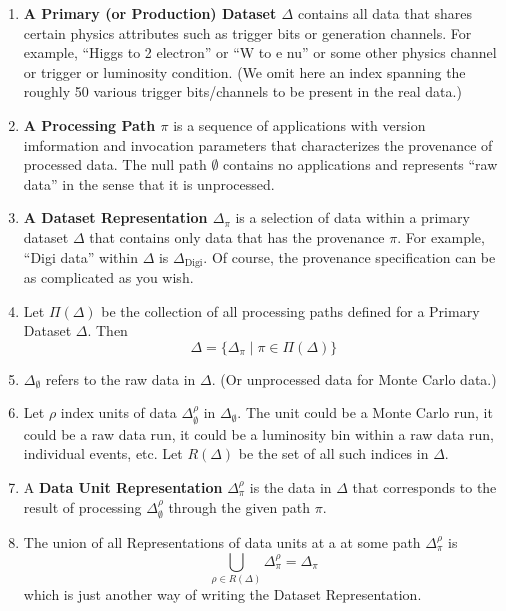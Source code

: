 \documentclass{cmspaper}
\begin{document}
\begin{enumerate}

\item {\bf A Primary (or Production) Dataset $\Delta$} 
contains all data that shares certain physics 
attributes such as trigger bits or generation channels.  For example, ``Higgs to 2 electron''
or ``W to e nu'' or some other physics channel or trigger or luminosity condition.  (We omit 
here an index spanning the roughly 50 various trigger bits/channels to be present in the 
real data.) 

\item {\bf A Processing Path $\pi$} is a sequence of applications with version imformation 
and invocation parameters that
characterizes the provenance of processed data.  The null path $\emptyset$ contains
no applications and represents ``raw data'' in the sense that it is unprocessed.  

\item {\bf A Dataset Representation $\Delta_{\pi}$} is a selection of data within a primary 
dataset $\Delta$ that contains only data that has the provenance $\pi$.  For example, 
``Digi data'' within $\Delta$ is $\Delta_{\mbox{Digi}}$.  Of course, the provenance specification 
can be as complicated as you wish.

\item Let $\Pi(\Delta)$ be the collection of all processing paths defined for a Primary 
Dataset $\Delta $.  Then 
\begin{equation}
    \Delta = \{ \Delta_{\pi} \mid \pi \in \Pi(\Delta) \}
\end{equation}

\item $\Delta_{\emptyset}$ refers to the raw data in $\Delta$. (Or unprocessed data for 
Monte Carlo data.) 

\item Let $\rho$ index units of data $\Delta_{\emptyset}^{\rho}$ 
in $\Delta_{\emptyset}$.  The unit 
could be a Monte Carlo run, it could be a raw data run, 
it could be a luminosity bin within a raw data run, 
individual events, etc.  Let $R(\Delta)$ be the 
set of all such indices in $\Delta$.

\item A {\bf Data Unit Representation} $\Delta_{\pi}^{\rho}$ is the 
data in $\Delta$ that corresponds to the result of processing $\Delta_{\emptyset}^{\rho}$ 
through the given path $\pi$.  

\item The union
of all Representations of data units at a at some path $\Delta_{\pi}^{\rho}$ is 
\begin{equation}
\bigcup_{\rho \in R(\Delta)} \Delta_{\pi}^{\rho} = \Delta_{\pi}
\end{equation}
which is just another way of writing the Dataset Representation.  


\end{enumerate}
\end{document}
